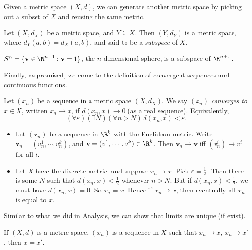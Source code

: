 \documentclass[a4paper]{article}
\begin{document}
Given a metric space $(X, d)$, we can generate another metric space by picking out a subset of $X$ and reusing the same metric.
\begin{defi}
  Let $(X, d_X)$ be a metric space, and $Y\subseteq X$. Then $(Y, d_Y)$ is a metric space, where $d_Y(a, b) = d_X(a, b)$, and said to be a \emph{subspace} of $X$.
\end{defi}

\begin{eg}
  $S^n = \{\mathbf{v}\in \R^{n + 1}: \mathbf{v} = 1\}$, the $n$-dimensional sphere, is a subspace of $\R^{n + 1}$.
\end{eg}

Finally, as promised, we come to the definition of convergent sequences and continuous functions.
\begin{defi}
  Let $(x_n)$ be a sequence in a metric space $(X, d_X)$. We say $(x_n)$ \emph{converges to} $x\in X$, written $x_n \to x$, if $d(x_n, x) \to 0$ (as a real sequence). Equivalently,
  \[
    (\forall \varepsilon)(\exists N)(\forall n > N)\, d(x_n, x) < \varepsilon.
  \]
\end{defi}
\begin{eg}\leavevmode
  \begin{itemize}
    \item Let $(\mathbf{v}_n)$ be a sequence in $\R^k$ with the Euclidean metric. Write $\mathbf{v}_n = (v_n^1, \cdots, v_n^k)$, and $\mathbf{v} = (v^1, \cdots, v^k)\in \R^k$. Then $\mathbf{v}_n \to \mathbf{v}$ iff $(v_n^i) \to v^i$ for all $i$.

    \item Let $X$ have the discrete metric, and suppose $x_n \to x$. Pick $\varepsilon = \frac{1}{2}$. Then there is some $N$ such that $d(x_n, x) < \frac{1}{2}$ whenever $n > N$. But if $d(x_n, x) < \frac{1}{2}$, we must have $d(x_n, x) = 0$. So $x_n = x$. Hence if $x_n \to x$, then eventually all $x_n$ is equal to $x$. 
      
  \end{itemize}
\end{eg}

Similar to what we did in Analysis, we can show that limits are unique (if exist).
\begin{prop}
  If $(X, d)$ is a metric space, $(x_n)$ is a sequence in $X$ such that $x_n \to x$, $x_n \to x'$, then $x = x'$.
\end{prop}
\end{document}

